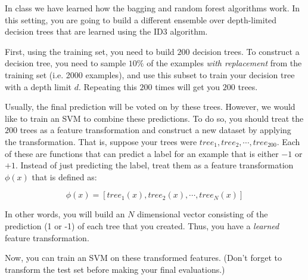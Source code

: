 \begin{enumerate}
  In class we have learned how the bagging and random forest
  algorithms work.  In this setting, you are going to build a
  different ensemble over depth-limited decision trees that are
  learned using the ID3 algorithm.

  First, using the training set, you need to build $200$ decision
  trees. To construct a decision tree, you need to sample $10\%$ of
  the examples {\em with replacement} from the training set
  (i.e. 2000 examples), and use this subset to train your decision
  tree with a depth limit $d$. Repeating this $200$ times will get
  you $200$ trees.

  Usually, the final prediction will be voted on by these
  trees. However, we would like to train an SVM to combine these
  predictions. To do so, you should treat the $200$ trees as a
  feature transformation and construct a new dataset by applying the
  transformation. That is, suppose your trees were
  $tree_1, tree_2, \cdots, tree_{200}$. Each of these are functions
  that can predict a label for an example that is either $-1$ or
  $+1$. Instead of just predicting the label, treat them as a
  feature transformation $\phi(x)$ that is defined as:

  
  $$\phi(x) = [tree_1(x), tree_2(x), \cdots, tree_{N} (x)]$$  

  In other words, you will build an $N$ dimensional vector
  consisting of the prediction (1 or -1) of each tree that you
  created. Thus, you have a {\em learned} feature transformation.

  Now, you can train an SVM on these transformed features. (Don't
  forget to transform the test set before making your final
  evaluations.)


\end{enumerate}
